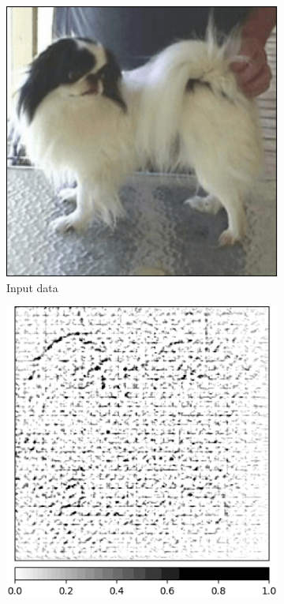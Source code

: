 \begin{figure}[h]
  \centering
 \begin{subfigure}{.23\textwidth}
    \centering
    \includegraphics[width=\textwidth]{background/images/org-Japanese_spaniel.png}
    \caption{Input data}\label{fig:attr-comparision-image}
\end{subfigure}
 \begin{subfigure}{.23\textwidth}
    \centering
    \includegraphics[width=\textwidth]{background/images/deconv-Japanese_spaniel.png}

\end{subfigure}
\end{figure}
